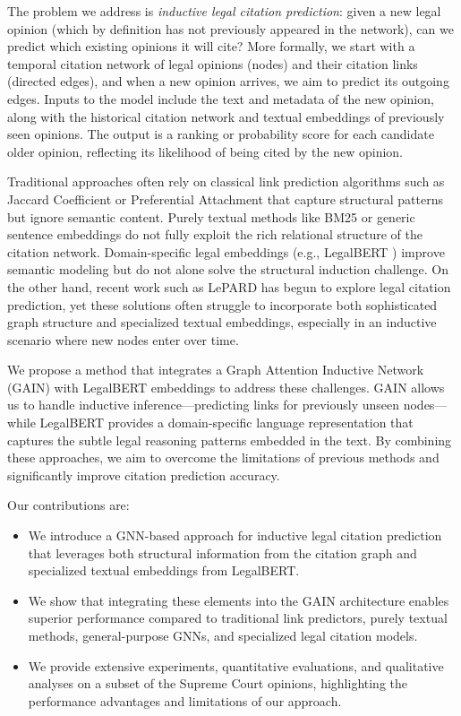 \documentclass{article}
\begin{document}
The problem we address is \emph{inductive legal citation prediction}: given a new legal opinion (which by definition has not previously appeared in the network), can we predict which existing opinions it will cite? More formally, we start with a temporal citation network of legal opinions (nodes) and their citation links (directed edges), and when a new opinion arrives, we aim to predict its outgoing edges. Inputs to the model include the text and metadata of the new opinion, along with the historical citation network and textual embeddings of previously seen opinions. The output is a ranking or probability score for each candidate older opinion, reflecting its likelihood of being cited by the new opinion.

Traditional approaches often rely on classical link prediction algorithms such as Jaccard Coefficient or Preferential Attachment \citep{liben2007link} that capture structural patterns but ignore semantic content. Purely textual methods like BM25 \citep{robertson2009probabilistic} or generic sentence embeddings \citep{reimers2019sentence} do not fully exploit the rich relational structure of the citation network. Domain-specific legal embeddings (e.g., LegalBERT \citep{chalkidis-etal-2020-legalbert}) improve semantic modeling but do not alone solve the structural induction challenge. On the other hand, recent work such as LePARD \citep{mahari2022lepard} has begun to explore legal citation prediction, yet these solutions often struggle to incorporate both sophisticated graph structure and specialized textual embeddings, especially in an inductive scenario where new nodes enter over time.

We propose a method that integrates a Graph Attention Inductive Network (GAIN) \citep{weng2022gain} with LegalBERT embeddings to address these challenges. GAIN allows us to handle inductive inference—predicting links for previously unseen nodes—while LegalBERT provides a domain-specific language representation that captures the subtle legal reasoning patterns embedded in the text. By combining these approaches, we aim to overcome the limitations of previous methods and significantly improve citation prediction accuracy.

Our contributions are:
\begin{itemize}[leftmargin=*]
    \item We introduce a GNN-based approach for inductive legal citation prediction that leverages both structural information from the citation graph and specialized textual embeddings from LegalBERT.
    \item We show that integrating these elements into the GAIN architecture enables superior performance compared to traditional link predictors, purely textual methods, general-purpose GNNs, and specialized legal citation models.
    \item We provide extensive experiments, quantitative evaluations, and qualitative analyses on a subset of the Supreme Court opinions, highlighting the performance advantages and limitations of our approach.
\end{itemize}
\end{document}
